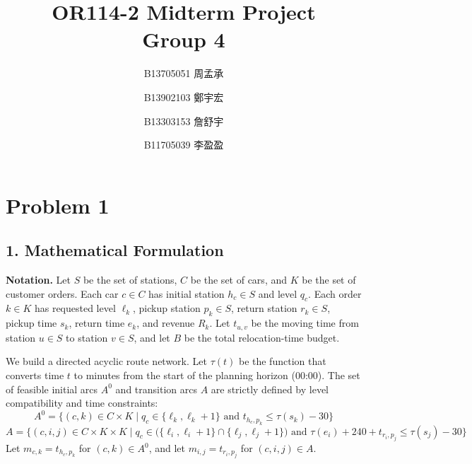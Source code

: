 \documentclass[10pt,a4paper]{article}
\title{OR114-2 Midterm Project \\[0.5em] \large Group 4}
\author{
B13705051 周孟承 \and
B13902103 鄭宇宏 \and
B13303153 詹舒宇 \and
B11705039 李盈盈
}
\date{}
\begin{document}
\maketitle

\section*{Problem 1}
\subsection*{1. Mathematical Formulation}

\textbf{Notation.}
Let $S$ be the set of stations, $C$ be the set of cars, and $K$ be the set of
customer orders.  Each car $c\in C$ has initial station $h_c\in S$ and level
$q_c$.  Each order $k\in K$ has requested level $\ell_k$, pickup station
$p_k\in S$, return station $r_k\in S$, pickup time $s_k$, return time $e_k$,
and revenue $R_k$.  Let $t_{u,v}$ be the moving time from station $u\in S$ to
station $v\in S$, and let $B$ be the total relocation-time budget.

We build a directed acyclic route network. Let $\tau(t)$ be the function that converts time $t$ to minutes from the start of the planning horizon (00:00). The set of feasible initial arcs $A^0$ and transition arcs $A$ are strictly defined by level compatibility and time constraints:
\[
A^0 = \{(c,k)\in C\times K \mid q_c\in\{\ell_k,\ell_k+1\} \text{ and } t_{h_c, p_k}\le \tau(s_k)-30\}
\]
\[
A = \Big\{ (c, i, j) \in C \times K \times K \;\Big|\; q_c \in \big(\{\ell_i, \ell_i+1\} \cap \{\ell_j, \ell_j+1\}\big) \text{ and } \tau(e_i) + 240 + t_{r_i, p_j} \le \tau(s_j) - 30 \Big\}
\]
Let $m_{c,k}=t_{h_c, p_k}$ for $(c,k)\in A^0$, and let
$m_{i,j}=t_{r_i, p_j}$ for $(c,i,j)\in A$.
\end{document}
